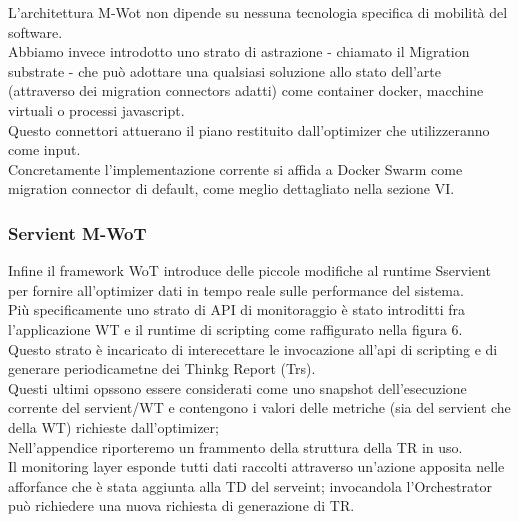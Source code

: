 \documentclass[11pt]{article}
\begin{document}
		L'architettura M-Wot non dipende su nessuna tecnologia specifica di mobilità del software. \\
		Abbiamo invece introdotto uno strato di astrazione - chiamato il Migration substrate - che può adottare una qualsiasi soluzione allo stato dell'arte (attraverso dei migration connectors adatti) come container docker, macchine virtuali o processi javascript. \\
		Questo connettori attuerano il piano restituito dall'optimizer che utilizzeranno come input.\\
		Concretamente l'implementazione corrente si affida a Docker Swarm come migration connector di default, come meglio dettagliato nella sezione VI.
		
		\subsubsection{Servient M-WoT}
		Infine il framework WoT introduce delle piccole modifiche al runtime Sservient per fornire all'optimizer dati in tempo reale sulle performance del sistema. \\
		Più specificamente uno strato di API di monitoraggio è stato introditti fra l'applicazione WT e il runtime di scripting come raffigurato nella figura 6.\\
		Questo strato è incaricato di interecettare le invocazione all'api di scripting e di generare periodicametne dei Thinkg Report (Trs). \\
		Questi ultimi opssono essere considerati come uno snapshot dell'esecuzione corrente del servient/WT e contengono i valori delle metriche (sia del servient che della WT) richieste dall'optimizer; \\
		Nell'appendice riporteremo un frammento della struttura della TR in uso. \\
		Il monitoring layer esponde tutti dati raccolti attraverso un'azione apposita nelle afforfance che è stata aggiunta alla TD del serveint; invocandola l'Orchestrator può richiedere una nuova richiesta di generazione di TR. \\
		
\end{document}

